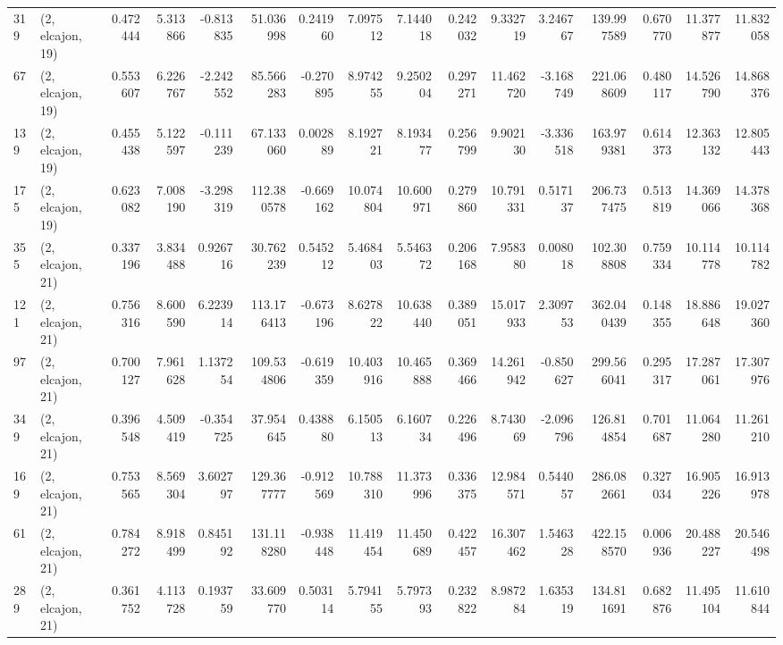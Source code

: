 \begin{tabular}{llrrrrrrrrrrrrrr}
319 &  (2, elcajon, 19) &   0.472444 &   5.313866 &  -0.813835 &    51.036998 &   0.241960 &   7.097512 &   7.144018 &  0.242032 &   9.332719 &   3.246767 &   139.997589 &  0.670770 &  11.377877 &  11.832058 \\
67  &  (2, elcajon, 19) &   0.553607 &   6.226767 &  -2.242552 &    85.566283 &  -0.270895 &   8.974255 &   9.250204 &  0.297271 &  11.462720 &  -3.168749 &   221.068609 &  0.480117 &  14.526790 &  14.868376 \\
139 &  (2, elcajon, 19) &   0.455438 &   5.122597 &  -0.111239 &    67.133060 &   0.002889 &   8.192721 &   8.193477 &  0.256799 &   9.902130 &  -3.336518 &   163.979381 &  0.614373 &  12.363132 &  12.805443 \\
175 &  (2, elcajon, 19) &   0.623082 &   7.008190 &  -3.298319 &   112.380578 &  -0.669162 &  10.074804 &  10.600971 &  0.279860 &  10.791331 &   0.517137 &   206.737475 &  0.513819 &  14.369066 &  14.378368 \\
355 &  (2, elcajon, 21) &   0.337196 &   3.834488 &   0.926716 &    30.762239 &   0.545212 &   5.468403 &   5.546372 &  0.206168 &   7.958380 &   0.008018 &   102.308808 &  0.759334 &  10.114778 &  10.114782 \\
121 &  (2, elcajon, 21) &   0.756316 &   8.600590 &   6.223914 &   113.176413 &  -0.673196 &   8.627822 &  10.638440 &  0.389051 &  15.017933 &   2.309753 &   362.040439 &  0.148355 &  18.886648 &  19.027360 \\
97  &  (2, elcajon, 21) &   0.700127 &   7.961628 &   1.137254 &   109.534806 &  -0.619359 &  10.403916 &  10.465888 &  0.369466 &  14.261942 &  -0.850627 &   299.566041 &  0.295317 &  17.287061 &  17.307976 \\
349 &  (2, elcajon, 21) &   0.396548 &   4.509419 &  -0.354725 &    37.954645 &   0.438880 &   6.150513 &   6.160734 &  0.226496 &   8.743069 &  -2.096796 &   126.814854 &  0.701687 &  11.064280 &  11.261210 \\
169 &  (2, elcajon, 21) &   0.753565 &   8.569304 &   3.602797 &   129.367777 &  -0.912569 &  10.788310 &  11.373996 &  0.336375 &  12.984571 &   0.544057 &   286.082661 &  0.327034 &  16.905226 &  16.913978 \\
61  &  (2, elcajon, 21) &   0.784272 &   8.918499 &   0.845192 &   131.118280 &  -0.938448 &  11.419454 &  11.450689 &  0.422457 &  16.307462 &   1.546328 &   422.158570 &  0.006936 &  20.488227 &  20.546498 \\
289 &  (2, elcajon, 21) &   0.361752 &   4.113728 &   0.193759 &    33.609770 &   0.503114 &   5.794155 &   5.797393 &  0.232822 &   8.987284 &   1.635319 &   134.811691 &  0.682876 &  11.495104 &  11.610844 \\

\end{tabular}
